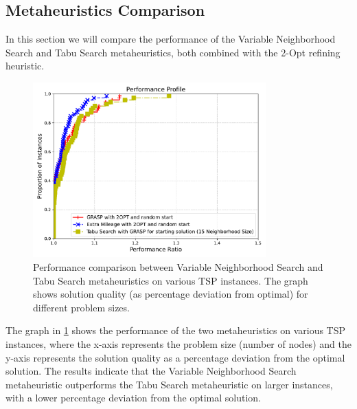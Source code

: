 \documentclass{article}
\begin{document}
\subsection{Metaheuristics Comparison}
In this section we will compare the performance of the Variable Neighborhood Search and Tabu Search metaheuristics, both combined with the 2-Opt refining heuristic.
\begin{figure}[!ht]
	\centering
	\includegraphics[width=0.8\textwidth]{plots/grasp_extra_tabu_2.pdf}
	\caption{Performance comparison between Variable Neighborhood Search and Tabu Search metaheuristics on various TSP instances. The graph shows solution quality (as percentage deviation from optimal) for different problem sizes.}
	\label{fig:vns_vs_tabu}
\end{figure}
The graph in \ref{fig:vns_vs_tabu} shows the performance of the two metaheuristics on various TSP instances, 
where the x-axis represents the problem size (number of nodes) and the y-axis represents the solution quality as a percentage deviation from the optimal solution.
The results indicate that the Variable Neighborhood Search metaheuristic outperforms the Tabu Search metaheuristic on larger instances,
with a lower percentage deviation from the optimal solution.
\end{document}
